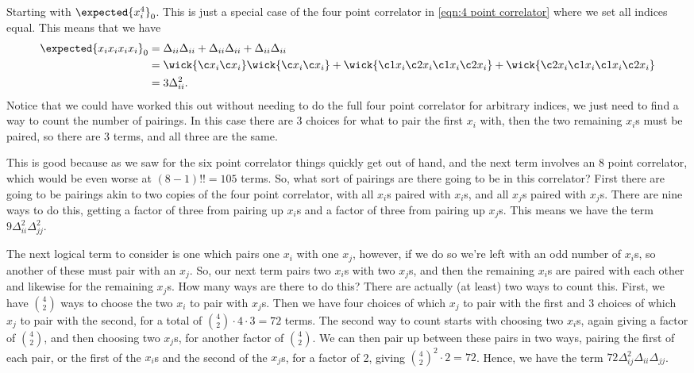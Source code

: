 \documentclass[fleqn]{NotesClass}
\begin{document}
    Starting with \(\expected{x_i^4}_0\).
    This is just a special case of the four point correlator in \cref{eqn:4 point correlator} where we set all indices equal.
    This means that we have
    \begin{align}
        \expected{x_ix_ix_ix_i}_0 &= \Delta_{ii}\Delta_{ii} + \Delta_{ii}\Delta_{ii} + \Delta_{ii}\Delta_{ii}\\
        &= \wick{\c x_i \c x_i} \wick{\c x_i \c x_i} + \wick{\c1 x_i \c2 x_i \c1 x_i \c2 x_i} + \wick{\c2 x_i \c1 x_i \c1 x_i \c2 x_i}\\
        &= 3 \Delta_{ii}^2.
    \end{align}
    Notice that we could have worked this out without needing to do the full four point correlator for arbitrary indices, we just need to find a way to count the number of pairings.
    In this case there are 3 choices for what to pair the first \(x_i\) with, then the two remaining \(x_i\)s must be paired, so there are 3 terms, and all three are the same.
    
    This is good because as we saw for the six point correlator things quickly get out of hand, and the next term involves an 8 point correlator, which would be even worse at \((8 - 1)!! = 105\) terms.
    So, what sort of pairings are there going to be in this correlator?
    First there are going to be pairings akin to two copies of the four point correlator, with all \(x_i\)s paired with \(x_i\)s, and all \(x_j\)s paired with \(x_j\)s.
    There are nine ways to do this, getting a factor of three from pairing up \(x_i\)s and a factor of three from pairing up \(x_j\)s.
    This means we have the term \(9\Delta_{ii}^2\Delta_{jj}^2\).
    
    The next logical term to consider is one which pairs one \(x_i\) with one \(x_j\), however, if we do so we're left with an odd number of \(x_i\)s, so another of these must pair with an \(x_j\).
    So, our next term pairs two \(x_i\)s with two \(x_j\)s, and then the remaining \(x_i\)s are paired with each other and likewise for the remaining \(x_j\)s.
    How many ways are there to do this?
    There are actually (at least) two ways to count this.
    First, we have \(\binom{4}{2}\) ways to choose the two \(x_i\) to pair with \(x_j\)s.
    Then we have four choices of which \(x_j\) to pair with the first and 3 choices of which \(x_j\) to pair with the second, for a total of \(\binom{4}{2} \cdot 4 \cdot 3 = 72\) terms.
    The second way to count starts with choosing two \(x_i\)s, again giving a factor of \(\binom{4}{2}\), and then choosing two \(x_j\)s, for another factor of \(\binom{4}{2}\).
    We can then pair up between these pairs in two ways, pairing the first of each pair, or the first of the \(x_i\)s and the second of the \(x_j\)s, for a factor of 2, giving \(\binom{4}{2}^2 \cdot 2 = 72\).
    Hence, we have the term \(72\Delta_{ij}^2\Delta_{ii}\Delta_{jj}\).
    
\end{document}

